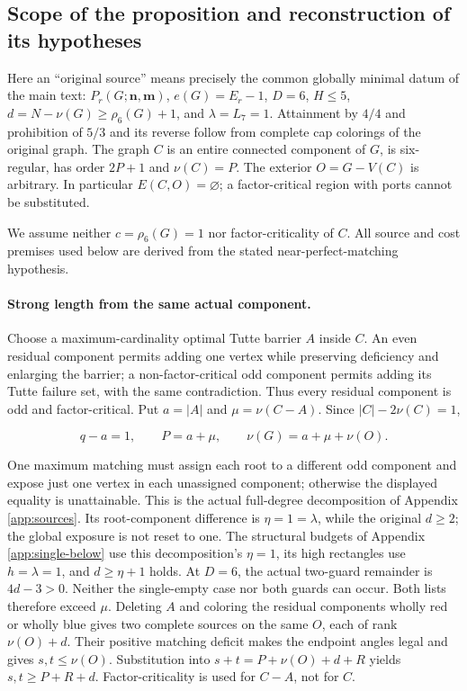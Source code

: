 \documentclass[11pt,a4paper]{article}
\newcommand{\nn}{\mathbf n}\newcommand{\mm}{\mathbf m}
\theoremstyle{definition}
\begin{document}
\subsection{Scope of the proposition and reconstruction of its hypotheses}
Here an ``original source'' means precisely the common globally minimal datum of the main text: $P_r(G;\nn,\mm)$, $e(G)=E_r-1$, $D=6$, $H\le5$, $d=N-\nu(G)\ge\rho_6(G)+1$, and $\lambda=L_7=1$. Attainment by $4/4$ and prohibition of $5/3$ and its reverse follow from complete cap colorings of the original graph. The graph $C$ is an entire connected component of $G$, is six-regular, has order $2P+1$ and $\nu(C)=P$. The exterior $O=G-V(C)$ is arbitrary. In particular $E(C,O)=\varnothing$; a factor-critical region with ports cannot be substituted.

We assume neither $c=\rho_6(G)=1$ nor factor-criticality of $C$. All source and cost premises used below are derived from the stated near-perfect-matching hypothesis.

\paragraph{Strong length from the same actual component.}
Choose a maximum-cardinality optimal Tutte barrier $A$ inside $C$. An even residual component permits adding one vertex while preserving deficiency and enlarging the barrier; a non-factor-critical odd component permits adding its Tutte failure set, with the same contradiction. Thus every residual component is odd and factor-critical. Put $a=|A|$ and $\mu=\nu(C-A)$. Since $|C|-2\nu(C)=1$,

\[
 q-a=1,\qquad P=a+\mu,\qquad \nu(G)=a+\mu+\nu(O).
\]

One maximum matching must assign each root to a different odd component and expose just one vertex in each unassigned component; otherwise the displayed equality is unattainable. This is the actual full-degree decomposition of Appendix \ref{app:sources}. Its root-component difference is $\eta=1=\lambda$, while the original $d\ge2$; the global exposure is not reset to one. The structural budgets of Appendix \ref{app:single-below} use this decomposition's $\eta=1$, its high rectangles use $h=\lambda=1$, and $d\ge\eta+1$ holds. At $D=6$, the actual two-guard remainder is $4d-3>0$. Neither the single-empty case nor both guards can occur.
Both lists therefore exceed $\mu$. Deleting $A$ and coloring the residual components wholly red or wholly blue gives two complete sources on the same $O$, each of rank $\nu(O)+d$. Their positive matching deficit makes the endpoint angles legal and gives $s,t\le\nu(O)$. Substitution into $s+t=P+\nu(O)+d+R$ yields $s,t\ge P+R+d$. Factor-criticality is used for $C-A$, not for $C$.
\end{document}
